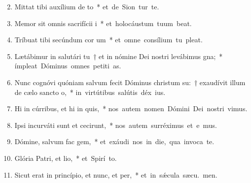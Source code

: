 \begin{flushleft}
\begin{enumerate}[leftmargin=*]
\setcounter{enumi}{1}

\item Mittat tibi auxílium de to~* \mbox{et de Sion tur te.}

\item Memor sit omnis sacrifícii i~* \mbox{et holocáustum tuum  beat.}

\item Tríbuat tibi secúndum cor um~* \mbox{et omne consílium tu pleat.}

\item Lætábimur in salutári tu~† et in nómine Dei nostri levábimus gna;~* \mbox{ímpleat Dóminus omnes petiti as.}

\item Nunc cognóvi quóniam salvum fecit Dóminus christum su:~† exaudívit illum de cælo sancto o,~* \mbox{in virtútibus salútis déx ius.}

\item Hi in cúrribus, et hi in quis,~* \mbox{nos autem nomen Dómini Dei nostri vimus.}

\item Ipsi incurváti sunt et cecirunt,~* \mbox{nos autem surréximus et e mus.}

\item Dómine, salvum fac gem,~* \mbox{et exáudi nos in die, qua invoca te.}

\item Glória Patri, et lio,~* \mbox{et Spirí to.}

\item Sicut erat in princípio, et nunc, et per,~* \mbox{et in s\'{\ae}cula sæcu. men.}

\end{enumerate}
\end{flushleft}

